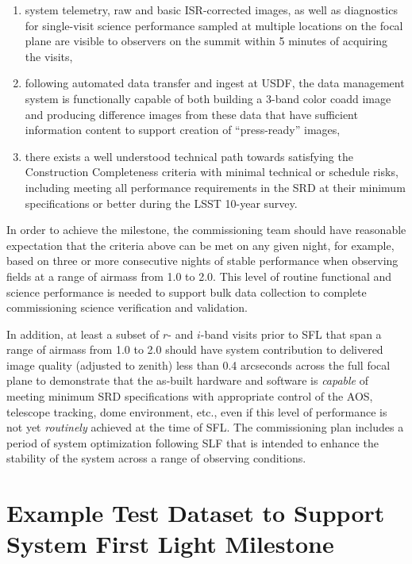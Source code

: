\documentclass[SE,authoryear,toc,lsstdraft]{lsstdoc}
\begin{document}
\begin{enumerate}
\begin{enumerate}
  \end{enumerate}
  \item system telemetry, raw and basic ISR-corrected images, as well as diagnostics for single-visit science performance sampled at multiple locations on the focal plane are visible to observers on the summit within 5 minutes of acquiring the visits,
  \item following automated data transfer and ingest at USDF, the data management system is functionally capable of both building a 3-band color coadd image and producing difference images from these data that have sufficient information content to support creation of ``press-ready'' images,
  \item there exists a well understood technical path towards satisfying the Construction Completeness criteria  with minimal technical or schedule risks, including meeting all performance requirements in the SRD at their minimum specifications or better during the LSST 10-year survey.
\end{enumerate}

In order to achieve the milestone, the commissioning team should have reasonable expectation that the criteria above can be met on any given night, for example, based on three or more consecutive nights of stable performance when observing fields at a range of airmass from 1.0 to 2.0.
This level of routine functional and science performance is needed to support bulk data collection to complete commissioning science verification and validation.

In addition, at least a subset of $r$- and $i$-band visits prior to SFL that span a range of airmass from 1.0 to 2.0 should have system contribution to delivered image quality (adjusted to zenith) less than 0.4 arcseconds across the full focal plane to demonstrate that the as-built hardware and software is \emph{capable} of meeting minimum SRD specifications with appropriate control of the AOS, telescope tracking, dome environment, etc., even if this level of performance is not yet \emph{routinely} achieved at the time of SFL.
The commissioning plan includes a period of system optimization following SLF that is intended to enhance the stability of the system across a range of observing conditions.

\section{Example Test Dataset to Support System First Light Milestone}
\label{dataset}
\end{document}
